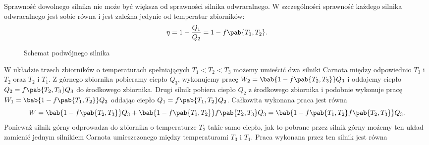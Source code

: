 Sprawność dowolnego silnika nie może być większa od sprawności silnika odwracalnego. W szczególności sprawność każdego silnika odwracalnego jest sobie równa i jest zależna jedynie od temperatur zbiorników:
\begin{equation}\label{eq:sprawnosc_carnot_Q}
	\eta = 1 - \frac{Q_1}{Q_2} = 1 - f\pab{T_1, T_2}.
\end{equation}
\begin{figure}
	\centering
	
	\caption{Schemat podwójnego silnika}
	\label{fig:schemat_podwojny_silnik}
\end{figure}
W układzie trzech zbiorników o temperaturach spełniających $T_1 < T_2 < T_3$ możemy umieścić dwa silniki Carnota między odpowiednio $T_3$ i $T_2$ oraz $T_2$ i $T_1$. Z górnego zbiornika pobieramy ciepło $Q_3$, wykonujemy pracę $W_2 = \bab{1 - f\pab{T_2, T_3}}Q_3$ i oddajemy ciepło $Q_2 = f\pab{T_2, T_3}Q_3$ do środkowego zbiornika. Drugi silnik pobiera ciepło $Q_2$ z środkowego zbiornika i podobnie wykonuje pracę $W_1 = \bab{1 - f\pab{T_1, T_2}}Q_2$ oddając ciepło $Q_1 = f\pab{T_1, T_2}Q_2$. Całkowita wykonana praca jest równa
\begin{equation}
W = \bab{1 - f\pab{T_2, T_3}}Q_3 + \bab{1 - f\pab{T_1, T_2}}f\pab{T_2, T_3}Q_3 = \bab{1 - f\pab{T_1, T_2}f\pab{T_2, T_3}}Q_3.
\end{equation}
Ponieważ silnik górny odprowadza do zbiornika o temperaturze $T_2$ takie samo ciepło, jak to pobrane przez silnik górny możemy ten układ zamienić jednym silnikiem Carnota umieszczonego między  temperaturami $T_3$ i $T_1$. Praca wykonana przez ten silnik jest równa
